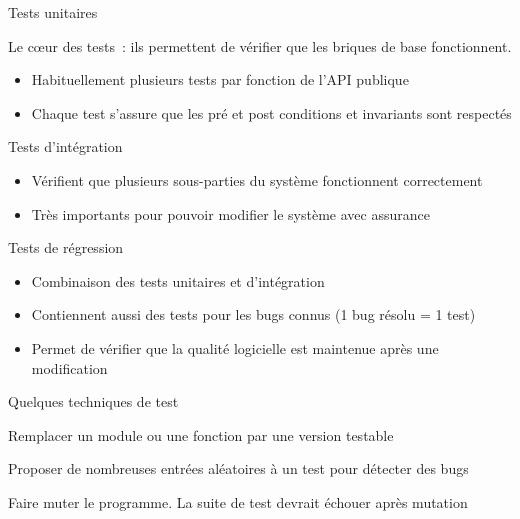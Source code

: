\begin{frame}{Tests unitaires}

  Le cœur des tests~: ils permettent de vérifier que les briques de base fonctionnent.

  \begin{itemize}[<+->]
    \item Habituellement plusieurs tests par fonction \alert{de l'API publique}
    \item Chaque test s'assure que les pré et post conditions et invariants sont respectés
  \end{itemize}
\end{frame}

\begin{frame}{Tests d'intégration}
  \begin{itemize}[<+->]
    \item Vérifient que plusieurs sous-parties du système fonctionnent correctement
    \item Très importants pour pouvoir modifier le système avec assurance
  \end{itemize}
\end{frame}

\begin{frame}{Tests de régression}
  \begin{itemize}[<+->]
    \item Combinaison des tests unitaires et d'intégration
    \item Contiennent aussi des tests pour les bugs connus (1 bug résolu = 1 test)
    \item Permet de vérifier que la qualité logicielle est maintenue après une modification
  \end{itemize}
\end{frame}

\begin{frame}{Quelques techniques de test}
  \begin{description}[<+->]
    \item[Mocking] Remplacer un module ou une fonction par une version testable
    \item[Fuzzing] Proposer de nombreuses entrées aléatoires à un test pour détecter des bugs
    \item[Mutation] Faire muter le programme. La suite de test devrait échouer après mutation
  \end{description}
\end{frame}

